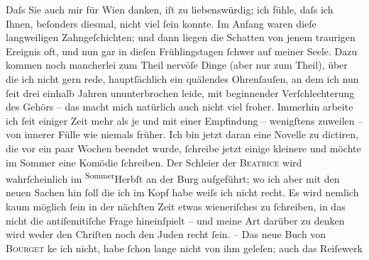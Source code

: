 \pstart
           Daſs Sie auch mir für Wien danken, iſt zu
               liebenswürdig; ich fühle, daſs ich Ihnen, beſonders diesmal, nicht viel ſein konnte.
               Im Anfang waren dieſe langweiligen Zahngeſchichten; und dann liegen die Schatten von
               jenem traurigen Ereignis oft, und nun gar in dieſen Frühlingstagen ſchwer auf meiner
               Seele. Dazu kommen noch mancherlei zum {\pb}Theil
               nervöſe Dinge (aber nur zum Theil), über die ich nicht gern rede, hauptſächlich ein
               quälendes Ohrenſauſen, an dem ich nun ſeit drei einhalb Jahren ununterbrochen leide,
               mit beginnender Verſchlechterung des Gehörs – das macht mich natürlich auch nicht
               viel froher. Immerhin arbeite ich ſeit einiger Zeit mehr als je und mit einer
               Empfindung – wenigſtens zuweilen – von innerer Fülle wie niemals früher. Ich bin
               jetzt daran eine Novelle zu
               dictiren, die vor ein paar Wochen beendet wurde, ſchreibe jetzt einige {\pb}kleinere und möchte im Sommer eine Komödie
               ſchreiben. Der Schleier der \textsc{Beatrice} wird wahrſcheinlich im \substVorne{}\textsuperscript{Sommer}\substDazwischen{}Herbſt\substHinten{} an der Burg aufgeführt; wo ich aber mit
               den neuen Sachen hin ſoll die ich im Kopf habe weiſs ich nicht recht. Es wird nemlich
               kaum möglich ſein in der nächſten Zeit etwas wieneriſches zu ſchreiben, in das nicht die antiſemitiſche Frage hineinſpielt –
               und meine Art darüber zu denken wird weder den Chriſten noch den Juden recht ſein. –
               Das neue Buch von \textsc{Bour{\pb}get} ke{\geminationn} ich nicht, habe ſchon lange nicht von ihm
               geleſen; auch das Reiſewerk

